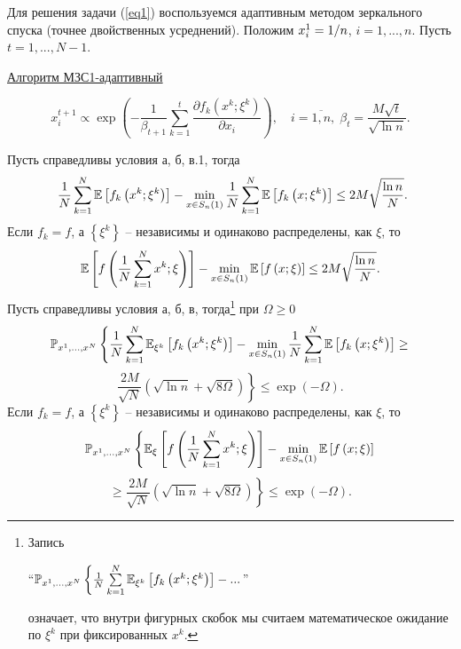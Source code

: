 Для решения задачи (\ref{eq1}) воспользуемся адаптивным методом зеркального спуска (точнее двойственных усреднений). Положим $x_i^1 =1 \mathord{\left/ 
{\vphantom {1 n}} \right. \kern-\nulldelimiterspace} n$, $i=1,...,n$. Пусть 
$t=1,...,N-1$.

\underline {Алгоритм МЗС1-адаптивный}

\[
x_i^{t+1} \propto \exp \left( {-\frac{1}{\beta _{t+1} }\sum\limits_{k=1}^t 
{\frac{\partial f_k \left( {x^k;\xi ^k} \right)}{\partial x_i }} } 
\right),\quad i=\overline{1,n},\; \beta _t 
=\frac{M\sqrt t }{\sqrt {\ln n} }.
\]

\begin{theorem}
Пусть справедливы условия а, б, в.1, тогда
\[
\mbox{ }\frac{1}{N}\sum\limits_{k=1}^N {\mathrm{{\mathbb E}}\left[ {f_k \left( {x^k;\xi ^k} 
\right)} \right]} -\mathop {\min }\limits_{x\in S_n \left( 1 \right)} 
\frac{1}{N}\sum\limits_{k=1}^N {\mathrm{{\mathbb E}} \left[ {f_k \left( {x;\xi ^k} 
\right)} \right]} \le 2M\sqrt {\frac{\ln n}{N}} .
\]
Если $f_k = f$, а $\left\{ {\xi ^k} \right\}$ -- независимы и одинаково распределены, как $\xi$, то
\[
\mathrm{{\mathbb E}}\left[ {f\left( {\frac{1}{N}\sum\limits_{k=1}^N {x^k} ;\xi } \right)} 
\right]-\mathop {\min }\limits_{x\in S_n \left( 1 \right)} \mathrm{{\mathbb E}} \left[ 
{f\left( {x;\xi } \right)} \right]\le 2M\sqrt {\frac{\ln n}{N}} .
\]
Пусть справедливы условия а, б, в, тогда\footnote{ Запись\par ``$\mathrm{{\mathbb P}}_{x^1,...,x^N} \left\{ 
{\frac{1}{N}\sum\limits_{k=1}^N {\mathrm{{\mathbb E}}_{\xi ^k} \left[ {f_k \left( {x^k;\xi ^k} 
\right)} \right]} -...} \right.$''\par означает, что внутри фигурных скобок мы 
считаем математическое ожидание по $\xi ^k$ при фиксированных $x^k$.} при $\Omega \ge 0$
\[
\mathrm{{\mathbb P}}_{x^1,...,x^N} \left\{ {\frac{1}{N}\sum\limits_{k=1}^N {\mathrm{{\mathbb E}}_{\xi ^k} \left[ 
{f_k \left( {x^k;\xi ^k} \right)} \right]} -\mathop {\min }\limits_{x\in S_n 
\left( 1 \right)} \frac{1}{N}\sum\limits_{k=1}^N {\mathrm{{\mathbb E}} \left[ {f_k 
\left( {x;\xi ^k} \right)} \right]} \ge } \right.
\]
\[
\left. {\frac{2M}{\sqrt N }\left( {\sqrt {\ln n} +\sqrt {8\Omega } } 
\right)} \right\} \le \exp \left( {-\Omega } \right).
\]
Если $f_k = f$, а $\left\{ {\xi ^k} \right\}$ -- независимы и одинаково распределены, как $\xi$, то
\[
\mathrm{{\mathbb P}}_{x^1,...,x^N} \left\{ {\mathrm{{\mathbb E}}_\xi \left[ {f\left( 
{\frac{1}{N}\sum\limits_{k=1}^N {x^k} ;\xi } \right)} \right]-\mathop {\min 
}\limits_{x\in S_n \left( 1 \right)} \mathrm{{\mathbb E}} \left[ {f\left( {x;\xi } \right)} 
\right]} \right.
\]
\[
\left. {\ge \frac{2M}{\sqrt N }\left( {\sqrt {\ln n} +\sqrt {8\Omega } } 
\right)} \right\} \le \exp \left( {-\Omega } \right).
\]
\end{theorem}

